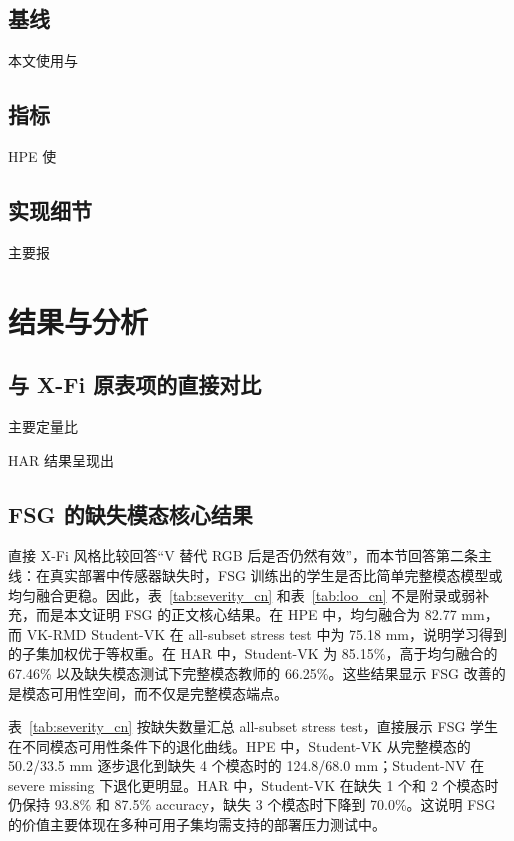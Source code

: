 \documentclass[UTF8,twocolumn]{ctexart}
\newcommand{\method}{VK-RMD}
\begin{document}
\subsection{基线}
本文使用与

\subsection{指标}
HPE 使

\subsection{实现细节}
主要报

\section{结果与分析}
\subsection{与 X-Fi 原表项的直接对比}
主要定量比


\FloatBarrier


\FloatBarrier

HAR 结果呈现出
\subsection{FSG 的缺失模态核心结果}
直接 X-Fi 风格比较回答“V 替代 RGB 后是否仍然有效”，而本节回答第二条主线：在真实部署中传感器缺失时，FSG 训练出的学生是否比简单完整模态模型或均匀融合更稳。因此，表~\ref{tab:severity_cn} 和表~\ref{tab:loo_cn} 不是附录或弱补充，而是本文证明 FSG 的正文核心结果。在 HPE 中，均匀融合为 82.77 mm，而 \method{} Student-VK 在 all-subset stress test 中为 75.18 mm，说明学习得到的子集加权优于等权重。在 HAR 中，Student-VK 为 85.15\%，高于均匀融合的 67.46\% 以及缺失模态测试下完整模态教师的 66.25\%。这些结果显示 FSG 改善的是模态可用性空间，而不仅是完整模态端点。

表~\ref{tab:severity_cn} 按缺失数量汇总 all-subset stress test，直接展示 FSG 学生在不同模态可用性条件下的退化曲线。HPE 中，Student-VK 从完整模态的 50.2/33.5 mm 逐步退化到缺失 4 个模态时的 124.8/68.0 mm；Student-NV 在 severe missing 下退化更明显。HAR 中，Student-VK 在缺失 1 个和 2 个模态时仍保持 93.8\% 和 87.5\% accuracy，缺失 3 个模态时下降到 70.0\%。这说明 FSG 的价值主要体现在多种可用子集均需支持的部署压力测试中。


\end{document}
